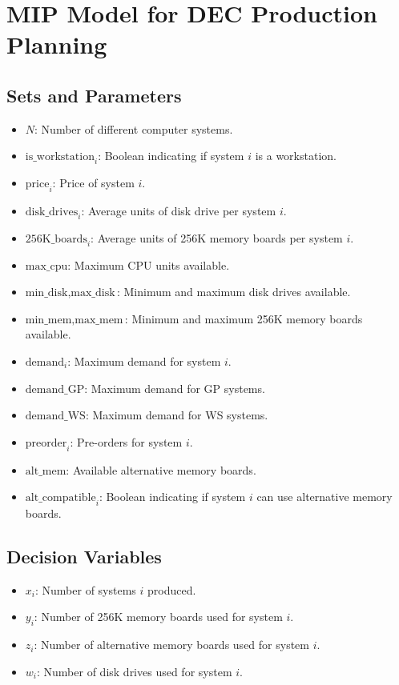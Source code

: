 \documentclass{article}
\begin{document}
\section*{MIP Model for DEC Production Planning}

\subsection*{Sets and Parameters}
\begin{itemize}
    \item \( N \): Number of different computer systems.
    \item \( \text{is\_workstation}_i \): Boolean indicating if system \( i \) is a workstation.
    \item \( \text{price}_i \): Price of system \( i \).
    \item \( \text{disk\_drives}_i \): Average units of disk drive per system \( i \).
    \item \( \text{256K\_boards}_i \): Average units of 256K memory boards per system \( i \).
    \item \( \text{max\_cpu} \): Maximum CPU units available.
    \item \( \text{min\_disk}, \text{max\_disk} \): Minimum and maximum disk drives available.
    \item \( \text{min\_mem}, \text{max\_mem} \): Minimum and maximum 256K memory boards available.
    \item \( \text{demand}_i \): Maximum demand for system \( i \).
    \item \( \text{demand\_GP} \): Maximum demand for GP systems.
    \item \( \text{demand\_WS} \): Maximum demand for WS systems.
    \item \( \text{preorder}_i \): Pre-orders for system \( i \).
    \item \( \text{alt\_mem} \): Available alternative memory boards.
    \item \( \text{alt\_compatible}_i \): Boolean indicating if system \( i \) can use alternative memory boards.
\end{itemize}

\subsection*{Decision Variables}
\begin{itemize}
    \item \( x_i \): Number of systems \( i \) produced.
    \item \( y_i \): Number of 256K memory boards used for system \( i \).
    \item \( z_i \): Number of alternative memory boards used for system \( i \).
    \item \( w_i \): Number of disk drives used for system \( i \).
\end{itemize}
\end{document}
